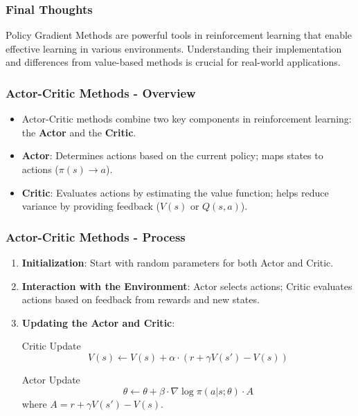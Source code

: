 \documentclass[aspectratio=169]{beamer}
\begin{document}
\begin{frame}[fragile]
    \frametitle{Final Thoughts}
    Policy Gradient Methods are powerful tools in reinforcement learning that enable effective learning in various environments. 
    Understanding their implementation and differences from value-based methods is crucial for real-world applications.
\end{frame}

\begin{frame}[fragile]
    \frametitle{Actor-Critic Methods - Overview}
    \begin{itemize}
        \item Actor-Critic methods combine two key components in reinforcement learning: the \textbf{Actor} and the \textbf{Critic}.
        \item \textbf{Actor}: Determines actions based on the current policy; maps states to actions ($\pi(s) \rightarrow a$).
        \item \textbf{Critic}: Evaluates actions by estimating the value function; helps reduce variance by providing feedback ($V(s)$ or $Q(s,a)$).
    \end{itemize}
\end{frame}

\begin{frame}[fragile]
    \frametitle{Actor-Critic Methods - Process}
    \begin{enumerate}
        \item \textbf{Initialization}: Start with random parameters for both Actor and Critic.
        \item \textbf{Interaction with the Environment}: Actor selects actions; Critic evaluates actions based on feedback from rewards and new states.
        \item \textbf{Updating the Actor and Critic}:
            \begin{block}{Critic Update}
                \begin{equation}
                    V(s) \leftarrow V(s) + \alpha \cdot (r + \gamma V(s') - V(s))
                \end{equation}
            \end{block}
            \begin{block}{Actor Update}
                \begin{equation}
                    \theta \leftarrow \theta + \beta \cdot \nabla \log \pi(a|s; \theta) \cdot A
                \end{equation}
                where \quad $A = r + \gamma V(s') - V(s)$.
            \end{block}
    \end{enumerate}
\end{frame}
\end{document}
